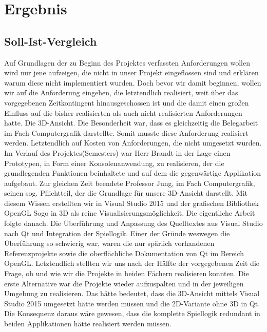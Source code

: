\documentclass[a4paper]{scrartcl}
\begin{document}
\section{Ergebnis}\label{ch:Ergebnis}
\subsection{Soll-Ist-Vergleich}\label{ch:Vergleich}
Auf Grundlagen der zu Beginn des Projektes verfassten Anforderungen wollen wird nur jene aufzeigen, die nicht in unser Projekt eingeflossen sind und erklären warum diese nicht implementiert wurden. Doch bevor wir damit beginnen, wollen wir auf die Anforderung eingehen, die letztendlich realisiert, weit über das vorgegebenen Zeitkontingent hinausgeschossen ist und die damit einen großen Einfluss auf die bisher realisierten als auch nicht realisierten Anforderungen hatte. Die 3D-Ansicht. Die Besonderheit war, dass es gleichzeitig die Belegarbeit im Fach Computergrafik darstellte. Somit musste diese Anforderung realisiert werden. Letztendlich auf Kosten von Anforderungen, die nicht umgesetzt wurden. Im Verlauf des Projektes(Semesters) war Herr Brandt in der Lage einen Prototypen, in Form einer Konsolenanwendung, zu realisieren, der die grundlegenden Funktionen beinhaltete und auf dem die gegenwärtige Applikation aufgebaut. Zur gleichen Zeit beendete Professor Jung, im Fach Computergrafik, seinen sog. Pflichtteil, der die Grundlage für unsere 3D-Ansicht darstellt. Mit diesem Wissen erstellten wir in Visual Studio 2015 und der grafischen Bibliothek OpenGL Sogo in 3D als reine Visualisierungsmöglichkeit. Die eigentliche Arbeit folgte danach. Die Überführung und Anpassung des Quelltextes aus Visual Studio nach Qt und Integration der Spiellogik. Einer der Gründe weswegen die Überführung so schwierig war, waren die nur spärlich vorhandenen Referenzprojekte sowie die oberflächliche Dokumentation von Qt im Bereich OpenGL. Letztendlich stellten wir uns nach der Hälfte der vorgegebenen Zeit die Frage, ob und wie wir die Projekte in beiden Fächern realisieren konnten. Die erste Alternative war die Projekte wieder aufzuspalten und in der jeweiligen Umgebung zu realisieren. Das hätte bedeutet, dass die 3D-Ansicht mittels Visual Studio 2015 umgesetzt hätte werden müssen und die 2D-Variante ohne 3D in Qt. Die Konsequenz daraus wäre gewesen, dass die komplette Spiellogik redundant in beiden Applikationen hätte realisiert werden müssen. 
\end{document}
